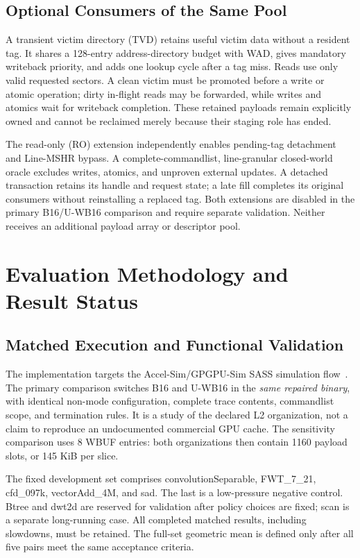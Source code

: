 \documentclass[conference,letterpaper]{IEEEtran}
\newcommand{\base}{B16}
\newcommand{\unif}{U-WB16}
\begin{document}
\subsection{Optional Consumers of the Same Pool}
A transient victim directory (TVD) retains useful victim data without a resident tag. It shares a 128-entry address-directory budget with WAD, gives mandatory writeback priority, and adds one lookup cycle after a tag miss. Reads use only valid requested sectors. A clean victim must be promoted before a write or atomic operation; dirty in-flight reads may be forwarded, while writes and atomics wait for writeback completion. These retained payloads remain explicitly owned and cannot be reclaimed merely because their staging role has ended.

The read-only (RO) extension independently enables pending-tag detachment and Line-MSHR bypass. A complete-commandlist, line-granular closed-world oracle excludes writes, atomics, and unproven external updates. A detached transaction retains its handle and request state; a late fill completes its original consumers without reinstalling a replaced tag. Both extensions are disabled in the primary \base{}/\unif{} comparison and require separate validation. Neither receives an additional payload array or descriptor pool.

\section{Evaluation Methodology and Result Status}
\subsection{Matched Execution and Functional Validation}
The implementation targets the Accel-Sim/GPGPU-Sim SASS simulation flow~\cite{accelsim}. The primary comparison switches \base{} and \unif{} in the \emph{same repaired binary}, with identical non-mode configuration, complete trace contents, commandlist scope, and termination rules. It is a study of the declared L2 organization, not a claim to reproduce an undocumented commercial GPU cache. The sensitivity comparison uses 8 WBUF entries: both organizations then contain 1160 payload slots, or 145 KiB per slice.

The fixed development set comprises convolutionSeparable, FWT\_7\_21, cfd\_097k, vectorAdd\_4M, and sad. The last is a low-pressure negative control. Btree and dwt2d are reserved for validation after policy choices are fixed; scan is a separate long-running case. All completed matched results, including slowdowns, must be retained. The full-set geometric mean is defined only after all five pairs meet the same acceptance criteria.
\end{document}
